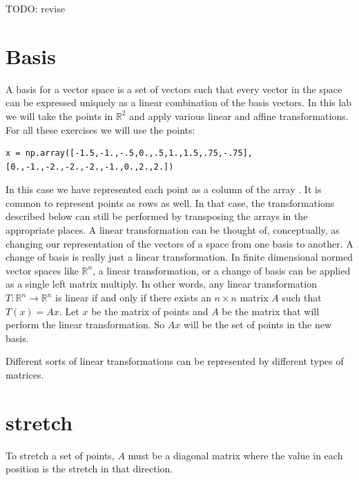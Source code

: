 \label{lab:ChangeBasis}


TODO: revise

\section*{Basis}

A basis for a vector space is a set of vectors such that every vector in the space can be expressed uniquely as a linear combination of the basis vectors.
In this lab we will take the points in $\mathbb{R}^2$ and apply various linear and affine transformations.
For all these exercises we will use the points:

\begin{lstlisting}
x = np.array([-1.5,-1.,-.5,0.,.5,1.,1.5,.75,-.75],[0.,-1.,-2.,-2.,-2.,-1.,0.,2.,2.])
\end{lstlisting}
In this case we have represented each point as a column of the array .
It is common to represent points as rows as well.
In that case, the transformations described below can still be performed by transposing the arrays in the appropriate  places.
A linear transformation can be thought of, conceptually, as changing our representation of the vectors of a space from one basis to another.
A change of basis is really just a linear transformation.
In finite dimensional normed vector spaces like $\mathbb{R}^n$, a linear transformation, or a change of basis can be applied as a single left matrix multiply.
In other words, any linear transformation $T : \mathbb{R}^n \to \mathbb{R}^n$ is linear if and only if there exists an $n\times n$ matrix $A$ such that $T\left(x\right) = A x$.
Let $x$ be the matrix of points and $A$ be the matrix that will perform the linear transformation.
So $A x$ will be the set of points in the new basis.

Different sorts of linear transformations can be represented by different types of matrices.

\section*{stretch}
To stretch a set of points, $A$ must be a diagonal matrix where the value in each position is the stretch in that direction.

